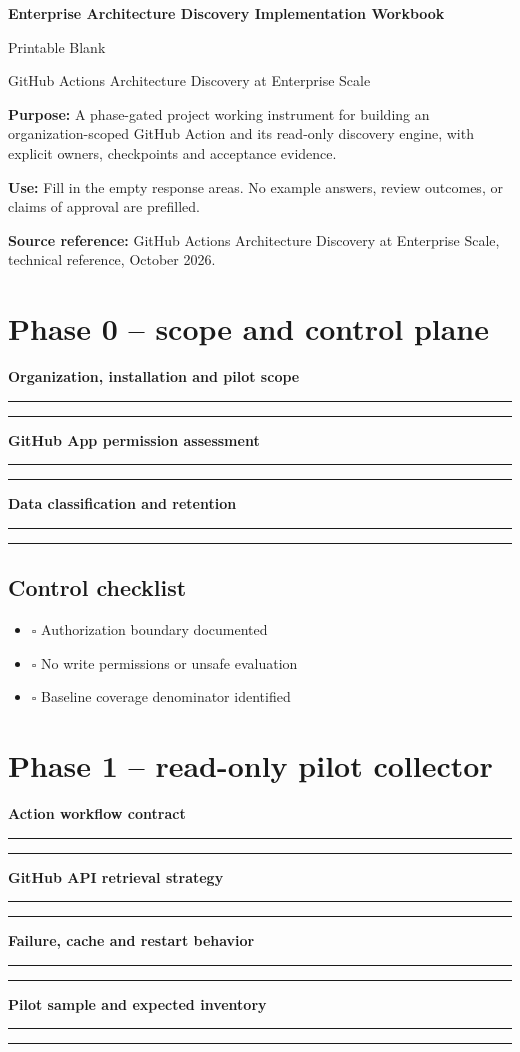 \documentclass[11pt,letterpaper]{article}
\newcommand{\Field}[2]{\par\noindent\textbf{#1}\par\vspace{1em}\noindent\rule{0.96\linewidth}{0.4pt}\par\vspace{1.0em}\noindent\rule{0.96\linewidth}{0.4pt}\par\vspace{1em}}
\begin{document}
\begin{center}
{\LARGE\bfseries Enterprise Architecture Discovery Implementation Workbook}\par
\vspace{0.3em}
{\large Printable Blank}\par
\vspace{0.5em}
{\small GitHub Actions Architecture Discovery at Enterprise Scale}
\end{center}
\noindent\textbf{Purpose:} A phase-gated project working instrument for building an organization-scoped GitHub Action and its read-only discovery engine, with explicit owners, checkpoints and acceptance evidence.

\noindent\textbf{Use:} Fill in the empty response areas. No example answers, review outcomes, or claims of approval are prefilled.

\noindent\textbf{Source reference:} GitHub Actions Architecture Discovery at Enterprise Scale, technical reference, October 2026.

\tableofcontents
\clearpage
\section{Phase 0 -- scope and control plane}
\Field{Organization, installation and pilot scope}{List authorized targets, exclusions, inventory denominator and intended owners.}
\Field{GitHub App permission assessment}{Record actual endpoint permissions, reviewer and least-privilege sign-off.}
\Field{Data classification and retention}{Document metadata sensitivity, export handling and access boundaries.}
\subsection{Control checklist}
\begin{itemize}
\item $\square$ Authorization boundary documented
\item $\square$ No write permissions or unsafe evaluation
\item $\square$ Baseline coverage denominator identified
\end{itemize}


\section{Phase 1 -- read-only pilot collector}
\Field{Action workflow contract}{Capture workflow\_dispatch input schema, authentication, concurrency and artifact publishing.}
\Field{GitHub API retrieval strategy}{Identify pagination, SHA pinning, selected file paths and conditional requests.}
\Field{Failure, cache and restart behavior}{Record retry rules, checkpoint design, error statuses and idempotency.}
\Field{Pilot sample and expected inventory}{Include diverse repos and an independently inspected baseline.}
\end{document}

